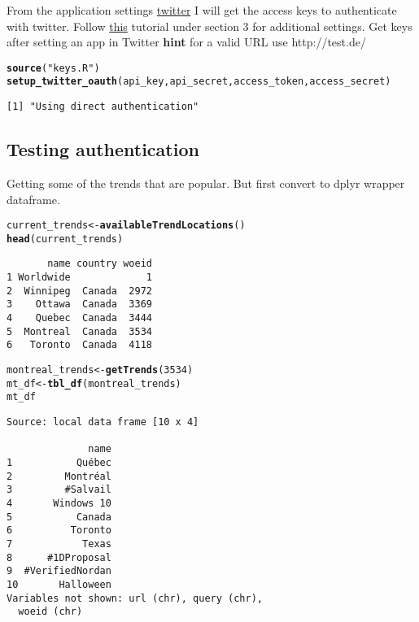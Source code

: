 \documentclass[9pt,english]{extarticle}\usepackage[]{graphicx}\usepackage[]{color}
\makeatletter
\newcommand{\hlnum}[1]{\textcolor[rgb]{0.686,0.059,0.569}{#1}}%
\newcommand{\hlstr}[1]{\textcolor[rgb]{0.192,0.494,0.8}{#1}}%
\newcommand{\hlstd}[1]{\textcolor[rgb]{0.345,0.345,0.345}{#1}}%
\newcommand{\hlkwb}[1]{\textcolor[rgb]{0.69,0.353,0.396}{#1}}%
\newcommand{\hlkwd}[1]{\textcolor[rgb]{0.737,0.353,0.396}{\textbf{#1}}}%
\newenvironment{kframe}{%
 \def\at@end@of@kframe{}%
 \ifinner\ifhmode%
  \def\at@end@of@kframe{\end{minipage}}%
  \begin{minipage}{\columnwidth}%
 \fi\fi%
 \def\FrameCommand##1{\hskip\@totalleftmargin \hskip-\fboxsep
 \colorbox{shadecolor}{##1}\hskip-\fboxsep
     \hskip-\linewidth \hskip-\@totalleftmargin \hskip\columnwidth}%
 \MakeFramed {\advance\hsize-\width
   \@totalleftmargin\z@ \linewidth\hsize
   \@setminipage}}%
 {\par\unskip\endMakeFramed%
 \at@end@of@kframe}
\newenvironment{knitrout}{}{} %
\makeatother
\begin{document}
\begin{linenumbers}
\noindent
From the application settings \href{https://apps.twitter.com/app/6985014/keys}{twitter} I will get the access keys to authenticate with twitter. Follow \href{http://geoffjentry.hexdump.org/twitteR.pdf}{this} tutorial under section 3 for additional settings.
Get keys after setting an app in Twitter \textbf{hint} for a valid URL use http://test.de/ 
\begin{knitrout}
\color{fgcolor}\begin{kframe}
\begin{alltt}
\hlkwd{source}\hlstd{(}\hlstr{"keys.R"}\hlstd{)}
\hlkwd{setup_twitter_oauth}\hlstd{(api_key, api_secret, access_token, access_secret)}
\end{alltt}
\begin{verbatim}
[1] "Using direct authentication"
\end{verbatim}
\end{kframe}
\end{knitrout}

\subsection{Testing authentication}
\label{subsec:test_oauth}

\noindent
Getting some of the trends that are popular. But first convert to dplyr wrapper dataframe.
\begin{knitrout}
\color{fgcolor}\begin{kframe}
\begin{alltt}
\hlstd{current_trends} \hlkwb{<-} \hlkwd{availableTrendLocations}\hlstd{()}
\hlkwd{head}\hlstd{(current_trends)}
\end{alltt}
\begin{verbatim}
       name country woeid
1 Worldwide             1
2  Winnipeg  Canada  2972
3    Ottawa  Canada  3369
4    Quebec  Canada  3444
5  Montreal  Canada  3534
6   Toronto  Canada  4118
\end{verbatim}
\begin{alltt}
\hlstd{montreal_trends} \hlkwb{<-} \hlkwd{getTrends}\hlstd{(}\hlnum{3534}\hlstd{)}
\hlstd{mt_df} \hlkwb{<-} \hlkwd{tbl_df}\hlstd{(montreal_trends)}
\hlstd{mt_df}
\end{alltt}
\begin{verbatim}
Source: local data frame [10 x 4]

              name
1           Québec
2         Montréal
3         #Salvail
4       Windows 10
5           Canada
6          Toronto
7            Texas
8      #1DProposal
9  #VerifiedNordan
10       Halloween
Variables not shown: url (chr), query (chr),
  woeid (chr)
\end{verbatim}
\end{kframe}
\end{knitrout}


\end{linenumbers}
\end{document}
